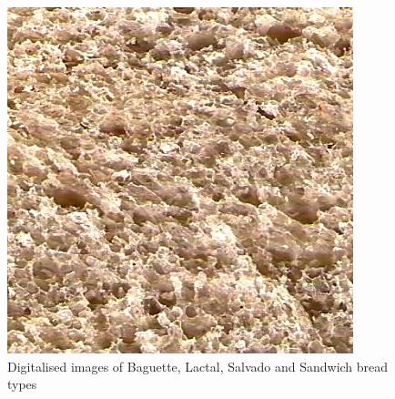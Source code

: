 \documentclass[oneside,a4paper,english,links]{amca}
\begin{document}
\begin{figure}[htb]
\includegraphics[scale=1.3]{imagenes/sandwich43}
\caption{Digitalised images of Baguette, Lactal, Salvado and Sandwich bread types}
\label{fig:panes}
\end{figure}
\end{document}
